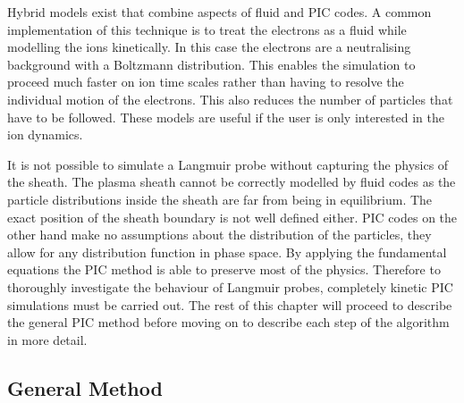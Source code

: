 Hybrid models exist that combine aspects of fluid and PIC codes. A common implementation of this technique is to treat the electrons as a fluid while modelling the ions kinetically. In this case the electrons are a neutralising background with a Boltzmann distribution. This enables the simulation to proceed much faster on ion time scales rather than having to resolve the individual motion of the electrons. This also reduces the number of particles that have to be followed. These models are useful if the user is only interested in the ion dynamics.


It is not possible to simulate a Langmuir probe without capturing the physics of the sheath. The plasma sheath cannot be correctly modelled by fluid codes as the particle distributions inside the sheath are far from being in equilibrium. The exact position of the sheath boundary is not well defined either. PIC codes on the other hand make no assumptions about the distribution of the particles, they allow for any distribution function in phase space. By applying the fundamental equations the PIC method is able to preserve most of the physics. Therefore to thoroughly investigate the behaviour of Langmuir probes, completely kinetic PIC simulations must be carried out. The rest of this chapter will proceed to describe the general PIC method before moving on to describe each step of the algorithm in more detail. 





\subsection{General Method} 




